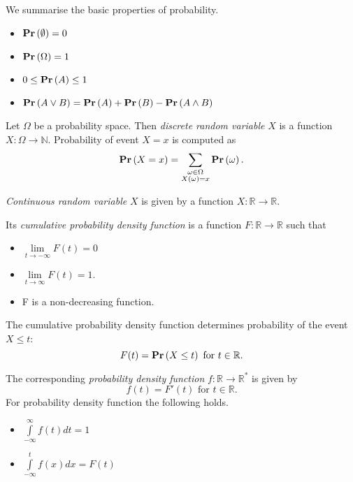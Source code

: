 We summarise the basic properties of probability.
\begin{itemize}
\item $\mathbf{Pr}\left(\emptyset\right) = 0$
\item $\mathbf{Pr}\left(\Omega\right) = 1$
\item $0 \leq \mathbf{Pr}\left(A\right) \leq 1$
\item $\mathbf{Pr}\left(A \vee B\right) = \mathbf{Pr}\left(A\right) + \mathbf{Pr}\left(B\right) - \mathbf{Pr}\left(A \wedge B\right)$
\end{itemize}

\begin{definition}
Let $\Omega$ be a probability space. Then \emph{discrete random variable} $X$ is a function $X: \Omega \rightarrow \mathbb{N}$. Probability of event $X = x$ is computed as 
\[
\mathbf{Pr}\left(X = x\right) = \displaystyle\sum_{\substack{\omega \in \Omega \\ X(\omega) = x}} \mathbf{Pr}\left(\omega\right) \text{.}
\]
\end{definition}

\begin{definition}
\emph{Continuous random variable} $X$ is given by a function $X: \mathbb{R} \rightarrow \mathbb{R}$. 

Its \emph{cumulative probability density function} is a function $F: \mathbb{R} \rightarrow \mathbb{R}$ such that
\begin{itemize}
\item $\lim\limits_{t \rightarrow -\infty} F(t) = 0$
\item $\lim\limits_{t \rightarrow \infty} F(t) = 1$.
\item F is a non-decreasing function.
\end{itemize}

The cumulative probability density function determines probability of the event $X \leq t$:
\[
F(t) = \mathbf{Pr}\left(X \leq t\right) \text{ for } t \in \mathbb{R} \text{.}
\]

The corresponding \emph{probability density function} $f: \mathbb{R} \rightarrow \mathbb{R}^{*}$ is given by \[ f(t) = F'(t) \text{ for } t \in \mathbb{R} \text{.} \] For probability density function the following holds.
\begin{itemize}
\item $\int\limits_{-\infty}^{\infty} f(t) dt = 1$
\item $\int\limits_{-\infty}^{t} f(x) dx = F(t)$
\end{itemize}
\end{definition}

